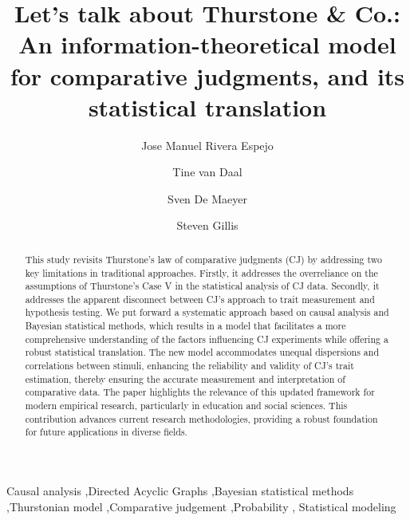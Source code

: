 \documentclass[
  authoryear,
  preprint,
  1p]{elsarticle}
\begin{document}
\begin{frontmatter}
\title{Let's talk about Thurstone \& Co.: An information-theoretical
model for comparative judgments, and its statistical translation}
\author[1]{Jose Manuel Rivera Espejo%
%
}
\author[1]{Tine van Daal%
%
}
\author[1]{Sven De Maeyer%
%
}
\author[2]{Steven Gillis%
%
}






        
\begin{abstract}
This study revisits Thurstone's law of comparative judgments (CJ) by
addressing two key limitations in traditional approaches. Firstly, it
addresses the overreliance on the assumptions of Thurstone's Case V in
the statistical analysis of CJ data. Secondly, it addresses the apparent
disconnect between CJ's approach to trait measurement and hypothesis
testing. We put forward a systematic approach based on causal analysis
and Bayesian statistical methods, which results in a model that
facilitates a more comprehensive understanding of the factors
influencing CJ experiments while offering a robust statistical
translation. The new model accommodates unequal dispersions and
correlations between stimuli, enhancing the reliability and validity of
CJ's trait estimation, thereby ensuring the accurate measurement and
interpretation of comparative data. The paper highlights the relevance
of this updated framework for modern empirical research, particularly in
education and social sciences. This contribution advances current
research methodologies, providing a robust foundation for future
applications in diverse fields.
\end{abstract}





\begin{keyword}
    Causal analysis \sep Directed Acyclic Graphs \sep Bayesian
statistical methods \sep Thurstonian model \sep Comparative
judgement \sep Probability \sep 
    Statistical modeling
\end{keyword}
\end{frontmatter}
    
\end{document}

